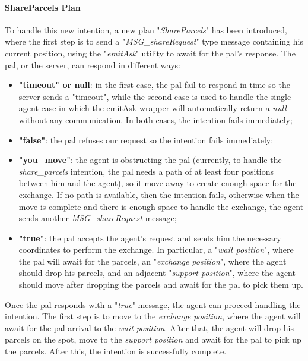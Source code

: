                 \paragraph{ShareParcels Plan}
                    To handle this new intention, a new plan "\textit{ShareParcels}" has been introduced, where the first step is to send a "\textit{MSG\_shareRequest}" type message containing his current position, using the "\textit{emitAsk}" utility to await for the pal's response. The pal, or the server, can respond in different ways:
                    \begin{itemize}
                        \item \textbf{"timeout" or null}: in the first case, the pal fail to respond in time so the server sends a "timeout", while the second case is used to handle the single agent case in which the emitAsk wrapper will automatically return a \textit{null} without any communication. In both cases, the intention fails immediately;
                        \item \textbf{"false"}: the pal refuses our request so the intention fails immediately;
                        \item \textbf{"you\_move"}: the agent is obstructing the pal (currently, to handle the \textit{share\_parcels} intention, the pal needs a path of at least four positions between him and the agent), so it move away to create enough space for the exchange. If no path is available, then the intention fails, otherwise when the move is complete and there is enough space to handle the exchange, the agent sends another \textit{MSG\_shareRequest} message;
                        \item \textbf{"true"}: the pal accepts the agent's request and sends him the necessary coordinates to perform the exchange. In particular, a "\textit{wait position}", where the pal will await for the parcels, an "\textit{exchange position}", where the agent should drop his parcels, and an adjacent "\textit{support position}", where the agent should move after dropping the parcels and await for the pal to pick them up.
                    \end{itemize}
                    Once the pal responds with a "\textit{true}" message, the agent can proceed handling the intention. The first step is to move to the \textit{exchange position}, where the agent will await for the pal arrival to the \textit{wait position}. After that, the agent will drop his parcels on the spot, move to the \textit{support position} and await for the pal to pick up the parcels. After this, the intention is successfully complete.
                
